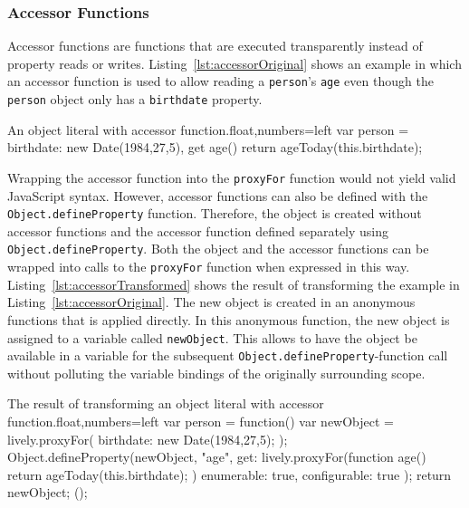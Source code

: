 \subsubsection{Accessor Functions}

Accessor functions are functions that are executed transparently instead of property reads or writes.
Listing~\ref{lst:accessorOriginal} shows an example in which an accessor function is used to allow reading a \lstinline{person}'s \lstinline{age} even though the \lstinline{person} object only has a \lstinline{birthdate} property.

\begin{code}{An object literal with accessor function.}{float,numbers=left}
var person = {
    birthdate: new Date(1984,27,5),
    get age() {
        return ageToday(this.birthdate);
    }
}
\end{code}
\iffalse
\end{verbatim}\fi

Wrapping the accessor function into the \lstinline{proxyFor} function would not yield valid JavaScript syntax.
However, accessor functions can also be defined with the \lstinline{Object.defineProperty} function.
Therefore, the object is created without accessor functions and the accessor function defined separately using \lstinline{Object.defineProperty}.
Both the object and the accessor functions can be wrapped into calls to the \lstinline{proxyFor} function when expressed in this way.
Listing~\ref{lst:accessorTransformed} shows the result of transforming the example in Listing~\ref{lst:accessorOriginal}.
The new object is created in an anonymous functions that is applied directly.
In this anonymous function, the new object is assigned to a variable called \lstinline{newObject}.
This allows to have the object be available in a variable for the subsequent \lstinline{Object.defineProperty}-function call without polluting the variable bindings of the originally surrounding scope.

\begin{code}{The result of transforming an object literal with accessor function.}{float,numbers=left}
var person = function() {
    var newObject = lively.proxyFor({
        birthdate: new Date(1984,27,5);
    });
    Object.defineProperty(newObject, "age", {
        get: lively.proxyFor(function age() {
            return ageToday(this.birthdate);
        })
        enumerable: true,
        configurable: true
    });
    return newObject;
}();
\end{code}
\iffalse
\end{verbatim}\fi



